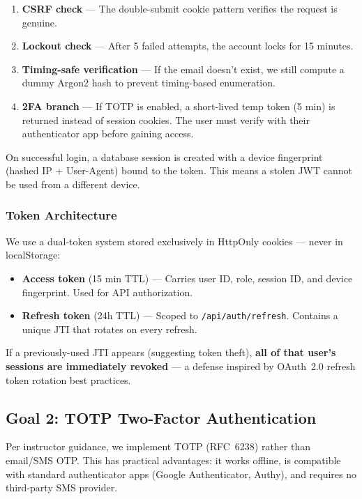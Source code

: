 \begin{enumerate}
    \item \textbf{CSRF check} — The double-submit cookie pattern verifies the request is genuine.
    \item \textbf{Lockout check} — After 5 failed attempts, the account locks for 15 minutes.
    \item \textbf{Timing-safe verification} — If the email doesn't exist, we still compute a dummy Argon2 hash to prevent timing-based enumeration.
    \item \textbf{2FA branch} — If TOTP is enabled, a short-lived temp token (5 min) is returned instead of session cookies. The user must verify with their authenticator app before gaining access.
\end{enumerate}

On successful login, a database session is created with a device fingerprint (hashed IP + User-Agent) bound to the token. This means a stolen JWT cannot be used from a different device.

\subsubsection{Token Architecture}

We use a dual-token system stored exclusively in HttpOnly cookies — never in localStorage:

\begin{itemize}
    \item \textbf{Access token} (15 min TTL) — Carries user ID, role, session ID, and device fingerprint. Used for API authorization.
    \item \textbf{Refresh token} (24h TTL) — Scoped to \texttt{/api/auth/refresh}. Contains a unique JTI that rotates on every refresh.
\end{itemize}

If a previously-used JTI appears (suggesting token theft), \textbf{all of that user's sessions are immediately revoked} — a defense inspired by OAuth~2.0 refresh token rotation best practices.

\subsection{Goal 2: TOTP Two-Factor Authentication}

Per instructor guidance, we implement TOTP (RFC~6238) rather than email/SMS OTP. This has practical advantages: it works offline, is compatible with standard authenticator apps (Google Authenticator, Authy), and requires no third-party SMS provider.

